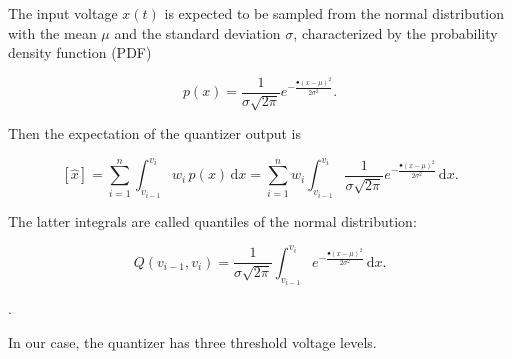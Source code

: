 \documentclass[letterpaper,twoside,12pt]{article}
\newcommand{\ud}{\mathrm d}
\begin{document}
The input voltage $x(t)$ is expected to be sampled from the normal distribution with the mean $\mu$ and the standard deviation $\sigma$, characterized by the probability density function (PDF) 

\begin{equation}
  \label{normal_pdf}
  p(x) =  \frac{1}{\sigma\sqrt{2\pi}} e^{-\frac{•(x-\mu)^2}{2\sigma^2}}.
\end{equation}

Then the expectation of the quantizer output is

\begin{equation}
  \label{q_expect}
  [\hat{x}] = \sum_{i=1}^n \int_{v_{i-1}}^{v_i} w_i \, p(x) \, \ud x =  
  \sum_{i=1}^n w_i \int_{v_{i-1}}^{v_i} \frac{1}{\sigma\sqrt{2\pi}} e^{-\frac{•(x-\mu)^2}{2\sigma^2}} \, \ud x.
\end{equation}

The latter integrals are called quantiles of the normal distribution:

\begin{equation}
  \label{quantile}
  Q(v_{i-1}, v_i) = \frac{1}{\sigma\sqrt{2\pi}} \int_{v_{i-1}}^{v_i} e^{-\frac{•(x-\mu)^2}{2\sigma^2}} \, \ud x.
\end{equation}


.\linebreak[4] \linebreak[4] \linebreak[4]


In our case, the quantizer has three threshold voltage levels.
\end{document}
